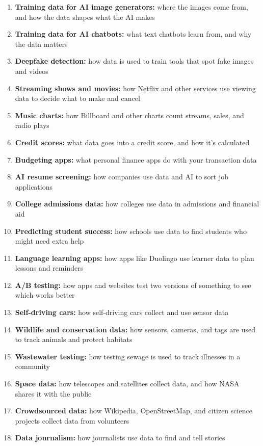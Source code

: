 \documentclass[12pt]{article}
\begin{document}
\begin{enumerate}
    \item \textbf{Training data for AI image generators:} where the images come from, and how the data shapes what the AI makes
    \item \textbf{Training data for AI chatbots:} what text chatbots learn from, and why the data matters
    \item \textbf{Deepfake detection:} how data is used to train tools that spot fake images and videos
    \item \textbf{Streaming shows and movies:} how Netflix and other services use viewing data to decide what to make and cancel
    \item \textbf{Music charts:} how Billboard and other charts count streams, sales, and radio plays
    \item \textbf{Credit scores:} what data goes into a credit score, and how it's calculated
    \item \textbf{Budgeting apps:} what personal finance apps do with your transaction data
    \item \textbf{AI resume screening:} how companies use data and AI to sort job applications
    \item \textbf{College admissions data:} how colleges use data in admissions and financial aid
    \item \textbf{Predicting student success:} how schools use data to find students who might need extra help
    \item \textbf{Language learning apps:} how apps like Duolingo use learner data to plan lessons and reminders
    \item \textbf{A/B testing:} how apps and websites test two versions of something to see which works better
    \item \textbf{Self-driving cars:} how self-driving cars collect and use sensor data
    \item \textbf{Wildlife and conservation data:} how sensors, cameras, and tags are used to track animals and protect habitats
    \item \textbf{Wastewater testing:} how testing sewage is used to track illnesses in a community
    \item \textbf{Space data:} how telescopes and satellites collect data, and how NASA shares it with the public
    \item \textbf{Crowdsourced data:} how Wikipedia, OpenStreetMap, and citizen science projects collect data from volunteers
    \item \textbf{Data journalism:} how journalists use data to find and tell stories

\end{enumerate}
\end{document}
